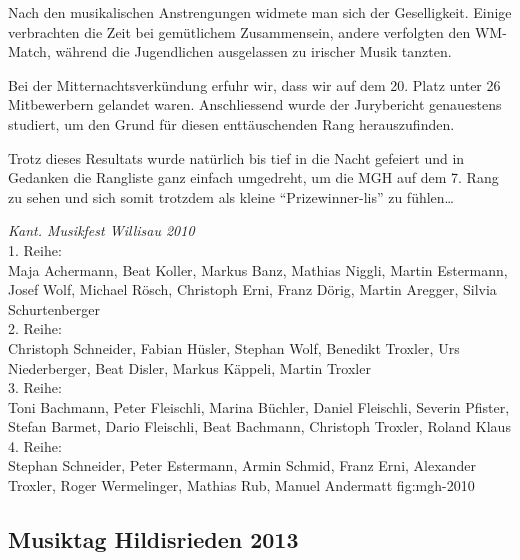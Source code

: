 \begin{history}
    Nach den musikalischen Anstrengungen widmete man sich der Geselligkeit.
    Einige verbrachten die Zeit bei gemütlichem Zusammensein, andere verfolgten
    den WM-Match, während die Jugendlichen ausgelassen zu irischer Musik
    tanzten.

    Bei der Mitternachtsverkündung erfuhr wir, dass wir auf dem 20. Platz unter
    26 Mitbewerbern gelandet waren. Anschliessend wurde der  Jurybericht
    genauestens studiert, um den Grund für diesen enttäuschenden Rang
    herauszufinden.

    Trotz dieses Resultats wurde natürlich bis tief in die Nacht gefeiert und in
    Gedanken die Rangliste ganz einfach umgedreht, um die MGH auf dem 7. Rang zu
    sehen und sich somit trotzdem als kleine \enquote{Prizewinner-lis} zu
    fühlen…

\end{history}

{\emph{Kant. Musikfest Willisau 2010}\\
    1. Reihe:\\
    Maja Achermann, Beat Koller, Markus Banz, Mathias Niggli, Martin Estermann,
    Josef Wolf, Michael Rösch, Christoph Erni, Franz Dörig, Martin Aregger,
    Silvia Schurtenberger\\
    2. Reihe:\\
    Christoph Schneider, Fabian Hüsler, Stephan Wolf, Benedikt Troxler, Urs
    Niederberger, Beat Disler, Markus Käppeli, Martin Troxler\\
    3. Reihe:\\
    Toni Bachmann, Peter Fleischli, Marina Büchler, Daniel Fleischli, Severin
    Pfister, Stefan Barmet, Dario Fleischli, Beat Bachmann, Christoph Troxler,
    Roland Klaus\\
    4. Reihe:\\
    Stephan Schneider, Peter Estermann, Armin Schmid, Franz Erni, Alexander
    Troxler, Roger Wermelinger, Mathias Rub, Manuel Andermatt } {fig:mgh-2010}


\subsection*{Musiktag Hildisrieden 2013}

